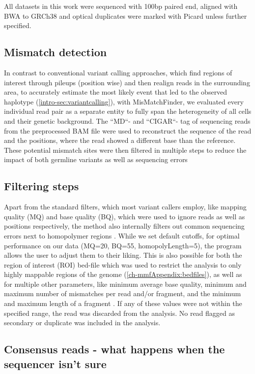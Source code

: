 All datasets in this work were sequenced with 100bp paired end, aligned with BWA to GRCh38 and optical duplicates were marked with Picard unless further specified.

\subsection{Mismatch detection}
In contrast to conventional variant calling approaches, which find regions of interest through pileups (position wise) and then realign reads in the surrounding area, to accurately estimate the most likely event that led to the observed haplotype (\autoref{intro-sec:variantcalling}), with MisMatchFinder, we evaluated every individual read pair as a separate entity to fully span the heterogeneity of all cells and their genetic background. The ``MD``- and ``CIGAR``- tag of sequencing reads from the preprocessed BAM file were used to reconstruct the sequence of the read and the positions, where the read showed a different base than the reference. These potential mismatch sites were then filtered in multiple steps to reduce the impact of both germline variants as well as sequencing errors

\subsection{Filtering steps}
Apart from the standard filters, which most variant callers employ, like mapping quality (MQ) and base quality (BQ), which were used to ignore reads as well as positions respectively, the method also internally filters out common sequencing errors next to homopolymer regions \cite{Heydari2019}. While we set default cutoffs, for optimal performance on our data (MQ=20, BQ=55, homopolyLength=5), the program allows the user to adjust them to their liking.
This is also possible for both the region of interest (ROI) bed-file which was used to restrict the analysis to only highly mappable regions of the genome (\autoref{ch-mmfAppendix:bedfiles}), as well as for multiple other parameters, like minimum average base quality, minimum and maximum number of mismatches per read and/or fragment, and the minimum and maximum length of a fragment \cite{Hudecova2021}. If any of these values were not within the specified range, the read was discarded from the analysis. No read flagged as secondary or duplicate was included in the analysis.

\subsection[Consensus reads]{Consensus reads - what happens when the sequencer isn't sure}
\label{mmf-sec:consensus}

